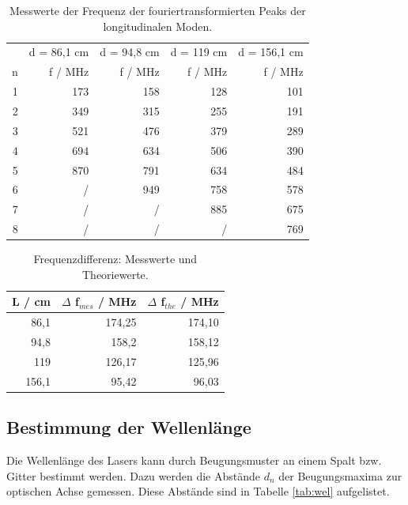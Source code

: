 \begin{table}[H]
  \centering
  \footnotesize
  \caption{Messwerte der Frequenz der fouriertransformierten Peaks der longitudinalen Moden.}
  \label{tab:lon}
  \begin{tabular}{r r r r r}
  \toprule
      & d = 86,1 \: cm & d = 94,8 \: cm & d = 119 \: cm & d = 156,1 \: cm  \\
    n & f / MHz & f / MHz  & f / MHz & f / MHz \\
  \midrule
    1 & 173 & 158 & 128 & 101 \\
    2 & 349 & 315 & 255 & 191 \\
    3 & 521 & 476 & 379 & 289 \\
    4 & 694 & 634 & 506 & 390 \\
    5 & 870 & 791 & 634 & 484 \\
    6 & /   & 949 & 758 & 578 \\
    7 & /   & /   & 885 & 675 \\
    8 & /   & /   & /   & 769 \\
  \bottomrule
  \end{tabular}
\end{table}


\begin{table}[H]
  \centering
  \footnotesize
  \caption{Frequenzdifferenz: Messwerte und Theoriewerte.}
  \label{tab:lon2}
  \begin{tabular}{r r r}
  \toprule
    L / cm & $\Delta$ f$_{mes}$ / MHz & $\Delta$ f$_{the}$ / MHz \\
  \midrule
      86,1 & 174,25 & 174,10 \\
      94,8 & 158,2  & 158,12 \\
      119  & 126,17 & 125,96 \\
      156,1& 95,42  & 96,03  \\
  \bottomrule
  \end{tabular}
\end{table}



\subsection{Bestimmung der Wellenlänge}
\label{sec:Bestimmung der Wellenlänge}
Die Wellenlänge des Lasers kann durch Beugungsmuster an einem Spalt bzw. Gitter bestimmt werden. 
Dazu werden die Abstände $d_n$ der Beugungsmaxima zur optischen Achse gemessen.
Diese Abstände sind in Tabelle \ref{tab:wel} aufgelistet.

